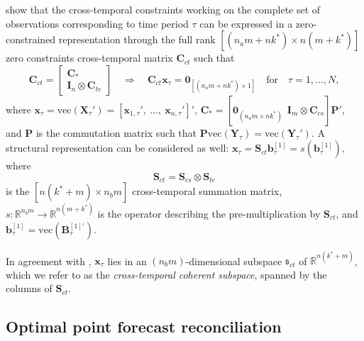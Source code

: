 \documentclass[a4paper,11pt]{article}
\newcommand{\bvet}{\bm{b}}
\newcommand{\xvet}{\bm{x}}
\newcommand{\Bvet}{\bm{B}}
\newcommand{\Cvet}{\bm{C}}
\newcommand{\Ivet}{\bm{I}}
\newcommand{\Pvet}{\bm{P}}
\newcommand{\Svet}{\bm{S}}
\newcommand{\Xvet}{\bm{X}}
\newcommand{\Yvet}{\bm{Y}}
\newcommand{\Zerovet}{\bm{0}}
\theoremstyle{definition}
\begin{document}
\cite{difonzo2023} show that the cross-temporal constraints working on the complete set of observations corresponding to time period $\tau$ can be expressed in a zero-constrained representation through the full rank $\left[(n_am+nk^\ast)\times n(m+k^\ast)\right]$ zero constraints cross-temporal matrix $\Cvet_{ct}$ such that
\begin{equation}
	\label{eq:Cct}
	\Cvet_{ct} = \begin{bmatrix}
		\Cvet_\ast \\
		\Ivet_n \otimes \Cvet_{te}
	\end{bmatrix} \quad \Longrightarrow \quad
	\Cvet_{ct} \xvet_{\tau} = \Zerovet_{[(n_am+nk^\ast)\times1]} \quad \mathrm{for} \quad \tau = 1,\dots,N,
\end{equation}
where $\xvet_{\tau} = \mathrm{vec}(\Xvet_{\tau}') = [\xvet_{1, \tau}',~ 	\dots, ~ \xvet_{n, \tau}']'$, $\Cvet_\ast = [\Zerovet_{(n_a m\times nk^\ast)} ~~ \Ivet_m \otimes \Cvet_{cs}]\Pvet'$, and $\Pvet$ is the commutation matrix \citep[][p. 54]{magnus2019} such that $\Pvet \mathrm{vec}(\Yvet_{\tau}) = \mathrm{vec}(\Yvet_{\tau}')$. A structural representation can be considered as well: $\xvet_\tau = \Svet_{ct}\bvet^{[1]}_\tau = s(\bvet_{\tau}^{[1]})$, where
\begin{equation}
	\label{eq:Sct}
	\Svet_{ct} = \Svet_{cs} \otimes \Svet_{te}
\end{equation}
is the $\left[n(k^\ast+m)\times n_b m\right]$ cross-temporal summation matrix, $s: \mathbb{R}^{n_b m} \rightarrow \mathbb{R}^{n(m+k^\ast)}$ is the operator describing the pre-multiplication by $\Svet_{ct}$, and $\bvet^{[1]}_\tau = \mathrm{vec}(\Bvet^{[1]\prime}_{\tau})$. 

In agreement with \cite{panagiotelis2021}, $\xvet_{\tau}$ lies in an $(n_b m)$-dimensional subspace $\mathfrak{s}_{ct}$ of $\mathbb{R}^{n(k^\ast+m)}$, which we refer to as the \textit{cross-temporal coherent subspace}, spanned by the columns of $\Svet_{ct}$. %

\subsection{Optimal point forecast reconciliation}\label{ssec:oct}
\end{document}
